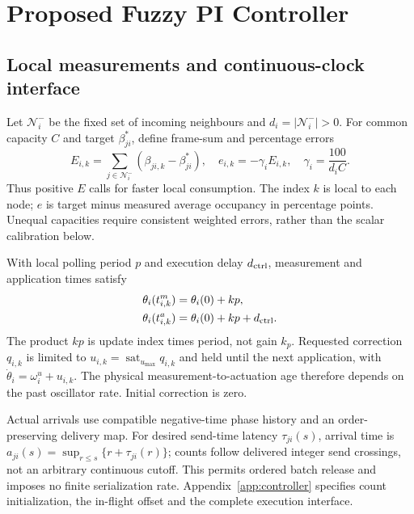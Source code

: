 \section{Proposed Fuzzy PI Controller}
\label{sec:fpi_controller}

\subsection{Local measurements and continuous-clock interface}
\label{subsec:fpi_laws}
Let $\mathcal N_i^-$ be the fixed set of incoming neighbours and
$d_i=|\mathcal N_i^-|>0$. For common capacity $C$ and target
$\beta_{ji}^*$, define frame-sum and percentage errors
\begin{equation}
 E_{i,k}=\sum_{j\in\mathcal N_i^-}(\beta_{ji,k}-\beta_{ji}^*),
 \quad e_{i,k}=-\gamma_iE_{i,k},\quad\gamma_i=\frac{100}{d_iC}.
 \label{eq:fpi_error}
\end{equation}
Thus positive $E$ calls for faster local consumption. The index $k$
is local to each node; $e$ is target minus measured average occupancy
in percentage points. Unequal capacities require consistent weighted
errors, rather than the scalar calibration below.

With local polling period $p$ and execution delay $d_{\rm ctrl}$,
measurement and application times satisfy
\begin{align}
 \theta_i(t^m_{i,k})&=\theta_i(0)+kp,\nonumber\\
 \theta_i(t^a_{i,k})&=\theta_i(0)+kp+d_{\rm ctrl}.
 \label{eq:fpi_local_schedule}
\end{align}
The product $kp$ is update index times period, not gain $k_p$.
Requested correction $q_{i,k}$ is limited to
$u_{i,k}=\operatorname{sat}_{u_{\max}}q_{i,k}$ and held until the
next application, with $\dot\theta_i=\omega_i^u+u_{i,k}$.
The physical measurement-to-actuation age therefore depends on the
past oscillator rate. Initial correction is zero.

Actual arrivals use compatible negative-time phase history and an
order-preserving delivery map. For desired send-time latency
$\tau_{ji}(s)$, arrival time is
$a_{ji}(s)=\sup_{r\le s}\{r+\tau_{ji}(r)\}$; counts follow delivered
integer send crossings, not an arbitrary continuous cutoff. This
permits ordered batch release and imposes no finite serialization rate.
Appendix~\ref{app:controller} specifies count initialization, the
in-flight offset and the complete execution interface.

